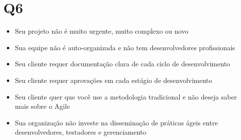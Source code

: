 \documentclass[11pt]{article}
\begin{document}
\section{Q6}
\label{sec:org49e8a83}
\begin{itemize}
\item Seu projeto não é muito urgente, muito complexo ou novo
\item Sua equipe não é auto-organizada e não tem desenvolvedores profissionais
\item Seu cliente requer documentação clara de cada ciclo de desenvolvimento
\item Seu cliente requer aprovações em cada estágio de desenvolvimento
\item Seu cliente quer que você use a metodologia tradicional e não deseja saber mais sobre o Agile
\item Sua organização não investe na disseminação de práticas ágeis entre desenvolvedores, testadores e gerenciamento
\end{itemize}
\end{document}
